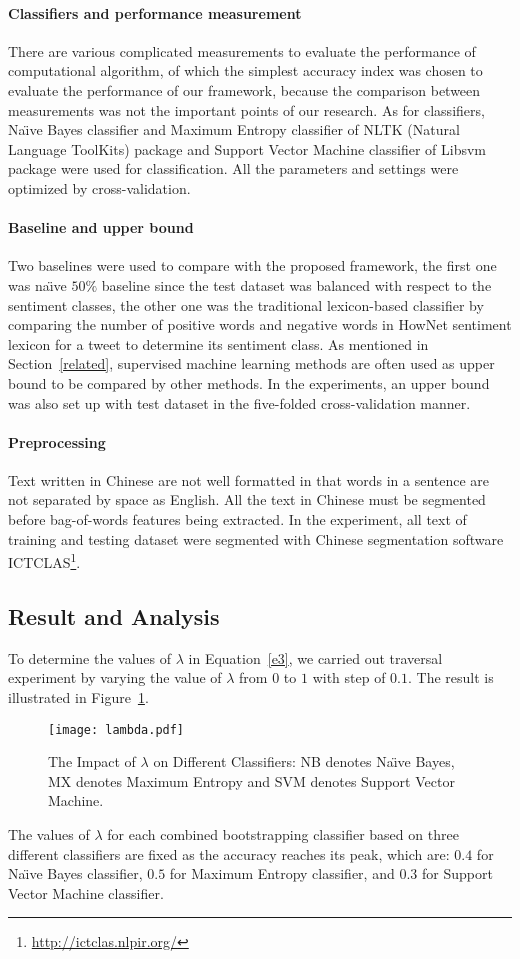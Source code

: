 \paragraph{Classifiers and performance measurement}
There are various complicated measurements to evaluate the performance of computational algorithm, of which the simplest accuracy index was chosen to evaluate the performance of our framework, because the comparison between measurements was not the important points of our research. 
As for classifiers, Na\"\i ve Bayes classifier and Maximum Entropy classifier of NLTK (Natural Language ToolKits) \cite{xsongx:b27} package and Support Vector Machine classifier of Libsvm \cite{xsongx:b28} package were used for classification. 
All the parameters and settings were optimized by cross-validation.
\paragraph{Baseline and upper bound}
Two baselines were used to compare with the proposed framework, the first one was na\"\i ve $ 50\% $ baseline since the test dataset was balanced with respect to the sentiment classes, the other one was the traditional lexicon-based classifier by comparing the number of positive words and negative words in HowNet sentiment lexicon for a tweet to determine its sentiment class.
As mentioned in Section~\ref{related}, supervised machine learning methods are often used as upper bound to be compared by other methods. 
In the experiments, an upper bound was also set up with test dataset in the five-folded cross-validation manner.
\paragraph{Preprocessing}
Text written in Chinese are not well formatted in that words in a sentence are not separated by space as English. 
All the text in Chinese must be segmented before bag-of-words features being extracted. 
In the experiment, all text of training and testing dataset were segmented with Chinese segmentation software ICTCLAS\footnote{\url{http://ictclas.nlpir.org/}}.

\subsection{Result and Analysis}
\label{result}
To determine the values of $ \lambda $ in Equation~\ref{e3}, we carried out traversal experiment by varying the value of $ \lambda $ from $ 0 $ to $ 1 $ with step of $ 0.1 $. The result is illustrated in Figure~\ref{fig2}.
\begin{figure}[!t]
\centering
\texttt{[image: lambda.pdf]}
\caption{The Impact of $ \lambda $ on Different Classifiers: NB denotes Na\"\i ve Bayes, MX denotes Maximum Entropy and SVM denotes Support Vector Machine.}
\label{fig2}
\end{figure}
The values of $ \lambda $ for each combined bootstrapping classifier based on three different classifiers are fixed as the accuracy reaches its peak, which are: $ 0.4 $ for Na\"\i ve Bayes classifier, $ 0.5 $ for Maximum Entropy classifier, and $ 0.3 $ for Support Vector Machine classifier.


